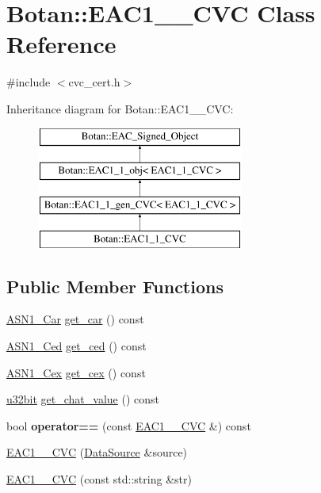 \hypertarget{classBotan_1_1EAC1__1__CVC}{\section{Botan\-:\-:E\-A\-C1\-\_\-\_\-\-C\-V\-C Class Reference}
\label{classBotan_1_1EAC1__1__CVC}
}


{\ttfamily \#include $<$cvc\-\_\-cert.\-h$>$}

Inheritance diagram for Botan\-:\-:E\-A\-C1\-\_\-\_\-\-C\-V\-C\-:\begin{figure}[H]
\begin{center}
\leavevmode
\includegraphics[height=4.000000cm]{classBotan_1_1EAC1__1__CVC}
\end{center}
\end{figure}
\subsection*{Public Member Functions}
\begin{DoxyCompactItemize}
\item 
\hyperlink{classBotan_1_1ASN1__Car}{A\-S\-N1\-\_\-\-Car} \hyperlink{classBotan_1_1EAC1__1__CVC_a6216a615c1b84b741218f8821bd00559}{get\-\_\-car} () const 
\item 
\hyperlink{classBotan_1_1ASN1__Ced}{A\-S\-N1\-\_\-\-Ced} \hyperlink{classBotan_1_1EAC1__1__CVC_ae7b022dd3421c92e2959c5853fc05cb5}{get\-\_\-ced} () const 
\item 
\hyperlink{classBotan_1_1ASN1__Cex}{A\-S\-N1\-\_\-\-Cex} \hyperlink{classBotan_1_1EAC1__1__CVC_a54be24bebcbc2e60d903bdfe80f671c2}{get\-\_\-cex} () const 
\item 
\hyperlink{namespaceBotan_aacc7d03c95e97e76168fc1c819031830}{u32bit} \hyperlink{classBotan_1_1EAC1__1__CVC_a10e269dd6c728d2220e8953c87f261b8}{get\-\_\-chat\-\_\-value} () const 
\item 
\hypertarget{classBotan_1_1EAC1__1__CVC_a94acf29740674442a80aaa5025fdfbce}{bool {\bfseries operator==} (const \hyperlink{classBotan_1_1EAC1__1__CVC}{E\-A\-C1\-\_\-\_\-\-C\-V\-C} \&) const }\label{classBotan_1_1EAC1__1__CVC_a94acf29740674442a80aaa5025fdfbce}

\item 
\hyperlink{classBotan_1_1EAC1__1__CVC_a1087717621c181da244831dcd07d4e84}{E\-A\-C1\-\_\-\_\-\-C\-V\-C} (\hyperlink{classBotan_1_1DataSource}{Data\-Source} \&source)
\item 
\hyperlink{classBotan_1_1EAC1__1__CVC_a37bea78081b91dce63879d9c16b4bc30}{E\-A\-C1\-\_\-\_\-\-C\-V\-C} (const std\-::string \&str)
\end{DoxyCompactItemize}
